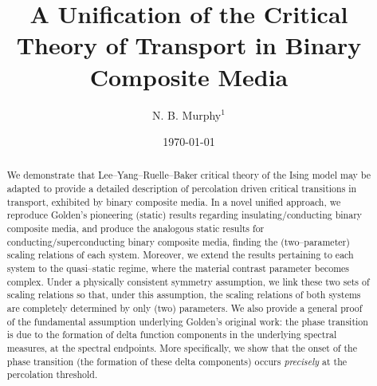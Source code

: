 \documentclass[english,12pt,jmp,graphicx]{revtex4-1}
\begin{document}

\title{A Unification of the Critical Theory of Transport in Binary
  Composite Media} %



\author{N. B. Murphy$^1$}
%


\date{\today}

\begin{abstract}
%
We demonstrate that Lee--Yang--Ruelle--Baker critical theory of the
Ising model may be adapted to provide a detailed description of
percolation driven critical transitions in transport, exhibited by
binary composite media. In a novel unified approach, we reproduce
Golden's pioneering (static) results regarding insulating/conducting
binary composite media, and produce the analogous static results for
conducting/superconducting binary composite media, finding the
(two--parameter) scaling relations of each system. Moreover, we extend
the results pertaining to each system to the quasi--static regime,
where the material contrast parameter becomes complex. Under a
physically consistent symmetry assumption, we link these two sets of
scaling relations so that, under this assumption, the scaling
relations of both systems are completely determined by only (two)
parameters. We also provide a general proof of the fundamental
assumption underlying Golden's original work: the phase transition is
due to the formation of delta function components in the underlying
spectral measures, at the spectral endpoints. More specifically, we
show that the onset of the phase transition (the formation of these
delta components) occurs \emph{precisely} at the percolation
threshold.    

%
\end{abstract}
\end{document}
